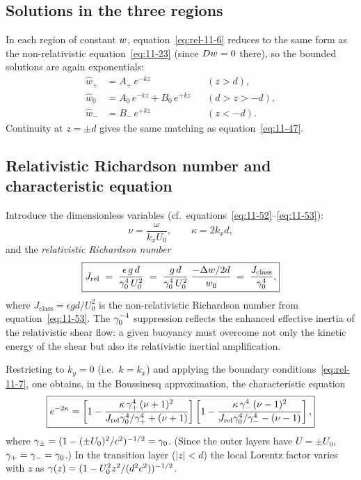 \subsection{Solutions in the three regions}

In each region of constant $w$, equation~\eqref{eq:rel-11-6}
reduces to the same form as the non-relativistic equation~\eqref{eq:11-23}
(since $Dw=0$ there), so the bounded solutions are again
exponentials:
\begin{equation}
\label{eq:rel-11-8}
\begin{aligned}
\hat{w}_{+} &= A_{+}\,e^{-kz} && (z > d), \\
\hat{w}_{0} &= A_{0}\,e^{-kz}+B_{0}\,e^{+kz} && (d > z > -d), \\
\hat{w}_{-} &= B_{-}\,e^{+kz} && (z < -d).
\end{aligned}
\end{equation}
Continuity at $z=\pm d$ gives the same matching as
equation~\eqref{eq:11-47}.

\subsection{Relativistic Richardson number and characteristic equation}

Introduce the dimensionless variables (cf.\ equations~\eqref{eq:11-52}--\eqref{eq:11-53}):
\begin{equation}
\label{eq:rel-11-9}
\nu = \frac{\omega}{k_{x}U_{0}},\qquad
\kappa = 2k_{x}d,
\end{equation}
and the \emph{relativistic Richardson number}
\begin{equation}
\label{eq:rel-11-10}
\boxed{
J_{\mathrm{rel}} \;=\;
\frac{\epsilon\,g\,d}{\gamma_{0}^{4}\,U_{0}^{2}}
\;=\;
\frac{g\,d}{\gamma_{0}^{4}\,U_{0}^{2}}\;
\frac{-\Delta w/2d}{w_{0}}
\;=\;
\frac{J_{\mathrm{class}}}{\gamma_{0}^{4}},
}
\end{equation}
where $J_{\mathrm{class}}=\epsilon g d/U_{0}^{2}$ is the
non-relativistic Richardson number from equation~\eqref{eq:11-53}.
The $\gamma_{0}^{-4}$ suppression reflects the enhanced effective
inertia of the relativistic shear flow: a given buoyancy must overcome
not only the kinetic energy of the shear but also its relativistic
inertial amplification.

Restricting to $k_{y}=0$ (i.e.\ $k=k_{x}$) and applying the boundary
conditions~\eqref{eq:rel-11-7}, one obtains, in the Boussinesq
approximation, the characteristic equation
\begin{equation}
\label{eq:rel-11-11}
\boxed{
e^{-2\kappa}
= \left[1
  -\frac{\kappa\,\gamma_{+}^{4}\,(\nu+1)^{2}}
    {J_{\mathrm{rel}}\gamma_{0}^{4}/\gamma_{+}^{4}+(\nu+1)}
\right]
\left[1
  -\frac{\kappa\,\gamma_{-}^{4}\,(\nu-1)^{2}}
    {J_{\mathrm{rel}}\gamma_{0}^{4}/\gamma_{-}^{4}-(\nu-1)}
\right],
}
\end{equation}
where $\gamma_{\pm}=(1-(\pm U_{0})^{2}/c^{2})^{-1/2}=\gamma_{0}$.  (Since
the outer layers have $U=\pm U_{0}$, $\gamma_{+}=\gamma_{-}=\gamma_{0}$.)
In the transition layer ($|z|<d$) the local Lorentz factor varies with
$z$ as $\gamma(z)=(1-U_{0}^{2}z^{2}/(d^{2}c^{2}))^{-1/2}$.

